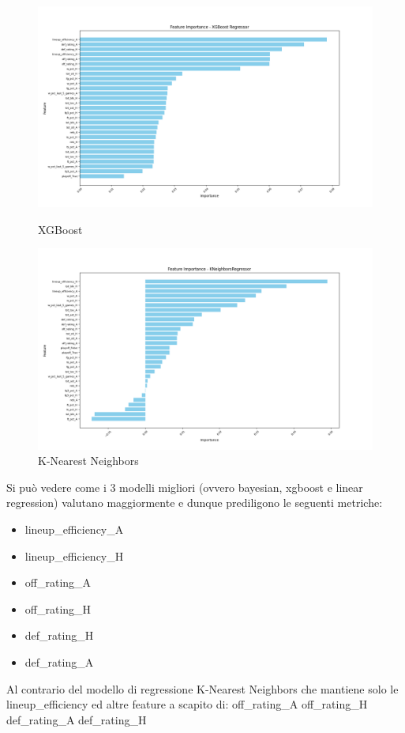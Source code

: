 \begin{figure}[H]
    \centering
    \begin{minipage}[b]{0.45\linewidth}
        \centering
        \includegraphics[width=\linewidth]{img/xgboost.png}
        \caption{XGBoost}
        \label{fig:first_label}
    \end{minipage}
    \hspace{0.05\linewidth}
    \begin{minipage}[b]{0.45\linewidth}
        \centering
        \includegraphics[width=\linewidth]{img/knn.png}
        \caption{K-Nearest Neighbors}
        \label{fig:second_label}
    \end{minipage}
\end{figure}

Si può vedere come i 3 modelli migliori (ovvero bayesian, xgboost e linear regression) valutano maggiormente e dunque prediligono le seguenti metriche:
\begin{itemize}
    \item lineup\_efficiency\_A
    \item lineup\_efficiency\_H
    \item off\_rating\_A
    \item off\_rating\_H
    \item def\_rating\_H
    \item def\_rating\_A
\end{itemize} 
Al contrario del modello di regressione K-Nearest Neighbors che mantiene solo le lineup\_efficiency ed altre feature a scapito di:
off\_rating\_A
off\_rating\_H
def\_rating\_A
def\_rating\_H

